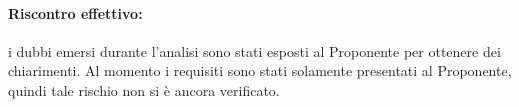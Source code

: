\documentclass[../PianoProgetto.tex]{subfiles}
\begin{document}
	\paragraph*{Riscontro effettivo:} i dubbi emersi durante l'analisi sono stati esposti al Proponente per ottenere dei chiarimenti. Al momento i requisiti sono stati solamente presentati al Proponente, quindi tale rischio non si è ancora verificato.

			
\end{document}
